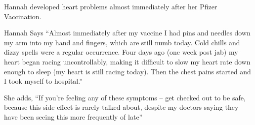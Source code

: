 Hannah developed heart problems almost immediately after her Pfizer Vaccination.

Hannah Says “Almost immediately after my vaccine I had pins and needles down my
arm into my hand and fingers, which are still numb today. Cold chills and dizzy
spells were a regular occurrence. Four days ago (one week post jab) my heart
began racing uncontrollably, making it difficult to slow my heart rate down
enough to sleep (my heart is still racing today). Then the chest pains started
and I took myself to hospital.”

She adds, “If you’re feeling any of these symptoms – get checked out to be safe,
because this side effect is rarely talked about, despite my doctors saying they
have been seeing this more frequently of late”

